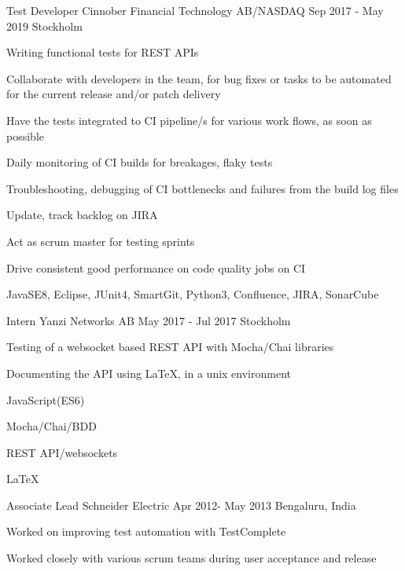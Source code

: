 \documentclass[11pt, a4paper]{awesome-cv}
\begin{document}
\begin{cventries}
    \cventry
      {Test Developer}
      {Cinnober Financial Technology AB/NASDAQ}
      {Sep 2017 - May 2019}
      {Stockholm}
      {
        \begin{cvitems}
          \item Writing functional tests for REST APIs
          \item Collaborate with developers in the team, for bug fixes or tasks to be automated
          for the current release and/or patch delivery
          \item Have the tests integrated to CI pipeline/s for various work flows, as soon as possible
          \item Daily monitoring of CI builds for breakages, flaky tests
          \item Troubleshooting, debugging of CI bottlenecks and failures from the build log files
          \item Update, track backlog on JIRA
          \item Act as scrum master for testing sprints
          \item Drive consistent good performance on code quality jobs on CI
          \item JavaSE8, Eclipse, JUnit4, SmartGit, Python3, Confluence, JIRA, SonarCube
        \end{cvitems}
      }

    \cventry
      {Intern}
      {Yanzi Networks AB}
      {May 2017 - Jul 2017}
      {Stockholm}
      {
        \begin{cvitems}
          \item Testing of a websocket based REST API with Mocha/Chai libraries
          \item Documenting the API using LaTeX, in a unix environment
          \item JavaScript(ES6)
          \item Mocha/Chai/BDD
          \item REST API/websockets
          \item LaTeX
          \end{cvitems}
      }


    \cventry
      {Associate Lead}
      {Schneider Electric}
      {Apr 2012- May 2013}
      {Bengaluru, India}
      {
        \begin{cvitems}
          \item Worked on improving test automation with TestComplete
          \item Worked closely with various scrum teams during user acceptance and release
          \end{cvitems}
      }


\end{cventries}
\end{document}
